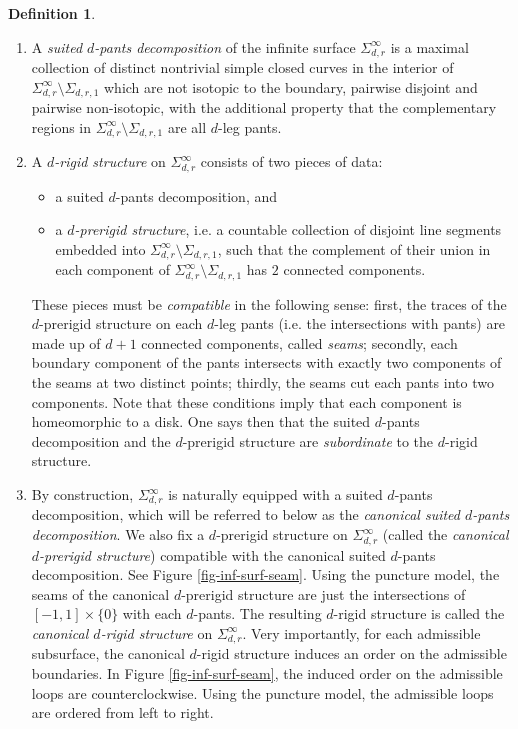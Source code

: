 \documentclass[11pt, a4paper]{amsart}
\theoremstyle{definition}
\newtheorem{defn}[thm]{Definition} %
\begin{document}
\begin{defn}\noindent
\begin{enumerate}
\item A {\em suited $d$-pants decomposition} of the infinite surface $\Sigma^{\infty}_{d,r}$ is a maximal collection
of distinct nontrivial simple closed curves  in the interior of  $\Sigma^{\infty}_{d,r} \setminus \Sigma_{d,r,1}$ which are not isotopic to the boundary, pairwise disjoint and pairwise non-isotopic, with the additional property that the complementary regions in  $\Sigma^{\infty}_{d,r} \setminus \Sigma_{d,r,1}$ are  all $d$-leg pants.
\item A {\em $d$-rigid structure}  on $\Sigma^{\infty}_{d,r}$ consists of two
pieces of data:%
\begin{itemize}
\item a suited $d$-pants
  decomposition, and
\item  a {\em $d$-prerigid structure}, i.e. a countable collection of disjoint
line segments embedded into $\Sigma^{\infty}_{d,r} \setminus \Sigma_{d,r,1}$, such that the complement of their
union in each component of  $\Sigma^{\infty}_{d,r} \setminus \Sigma_{d,r,1}$ has $2$ connected components.
\end{itemize}
These pieces must be {\em compatible} in the following sense:
first, the traces of the $d$-prerigid structure on each $d$-leg pants (i.e. the intersections with pants) are made up of $d+1$ connected components, called {\em seams}; secondly, each boundary component of the pants intersects with exactly two components of the seams at two distinct points; thirdly,  the seams cut each pants into two components.  Note that these conditions imply that each component is homeomorphic to a disk. One says then that the suited  $d$-pants decomposition and the $d$-prerigid structure are {\em subordinate} to the  $d$-rigid structure.
\item By construction, $\Sigma^{\infty}_{d,r}$ is naturally equipped with a suited $d$-pants decomposition, which will be referred to below as the {\em canonical suited $d$-pants decomposition}. We also fix a $d$-prerigid structure on $\Sigma^{\infty}_{d,r}$ (called the {\em canonical $d$-prerigid structure}) compatible with the canonical suited $d$-pants decomposition. See Figure \ref{fig-inf-surf-seam}. Using the puncture model,  the seams of the canonical $d$-prerigid structure are just the intersections of $[-1,1]\times \{0\}$ with each $d$-pants. The resulting $d$-rigid structure is called the {\em canonical $d$-rigid structure} on $\Sigma^{\infty}_{d,r}$. Very importantly, for each admissible subsurface, the canonical $d$-rigid structure induces an order on the admissible boundaries.  In  Figure \ref{fig-inf-surf-seam}, the induced order on the admissible loops are counterclockwise. Using the puncture model, the admissible loops are ordered from left to right.


\end{enumerate}
\end{defn}
\end{document}
